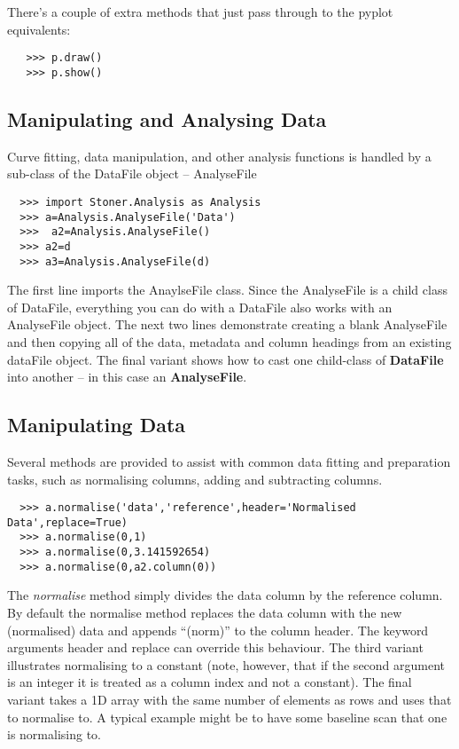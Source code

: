 \documentclass[a4paper,11pt]{scrartcl}
\begin{document}
 There's a couple of extra methods that just pass through to the pyplot equivalents:

 \begin{verbatim}
   >>> p.draw()
   >>> p.show()
 \end{verbatim}



\subsection{Manipulating and Analysing Data}

Curve fitting, data manipulation, and other analysis functions  is handled by a sub-class of the DataFile object -- AnalyseFile

\begin{verbatim}
  >>> import Stoner.Analysis as Analysis
  >>> a=Analysis.AnalyseFile('Data')
  >>>  a2=Analysis.AnalyseFile()
  >>> a2=d
  >>> a3=Analysis.AnalyseFile(d)
\end{verbatim}

The first line imports the AnaylseFile class. Since the AnalyseFile is a child
class of DataFile, everything you can do with a DataFile also works with an
AnalyseFile object. The next two lines demonstrate creating a blank AnalyseFile
and then copying all of the data, metadata and column headings from an existing
dataFile object. The final variant shows how to cast one child-class of \textbf{DataFile} into another -- in this case an \textbf{AnalyseFile}.

\subsection{Manipulating Data}

Several methods are provided to assist with common data fitting and preparation tasks, such as normalising columns, adding and subtracting columns.

\begin{verbatim}
  >>> a.normalise('data','reference',header='Normalised Data',replace=True)
  >>> a.normalise(0,1)
  >>> a.normalise(0,3.141592654)
  >>> a.normalise(0,a2.column(0))
\end{verbatim}

The \textit{normalise} method simply divides the data column by the reference column. By default the normalise method replaces the data column with the new (normalised) data and appends ``(norm)'' to the column header. The keyword arguments header and replace can override this behaviour. The third variant illustrates normalising to a constant (note, however, that if the second argument is an integer it is treated as a column index and not a constant). The final variant takes a 1D array with the same number of elements as rows and uses that to normalise to. A typical example might be to have some baseline scan that one is normalising to.
\end{document}
